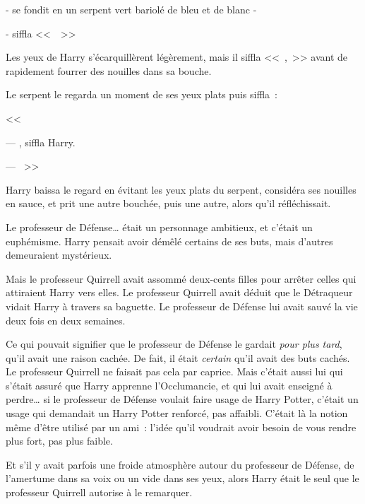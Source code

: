 - se fondit en un serpent vert bariolé de bleu et de blanc -

- siffla <<~~>>

Les yeux de Harry s'écarquillèrent légèrement, mais il siffla <<~,~>> avant de rapidement fourrer des nouilles dans sa bouche.

Le serpent le regarda un moment de ses yeux plats puis siffla~:

<<~

--- , siffla Harry.

--- ~>>

Harry baissa le regard en évitant les yeux plats du serpent, considéra ses nouilles en sauce, et prit une autre bouchée, puis une autre, alors qu'il réfléchissait.

Le professeur de Défense… était un personnage ambitieux, et c'était un euphémisme. Harry pensait avoir démêlé certains de ses buts, mais d'autres demeuraient mystérieux.

Mais le professeur Quirrell avait assommé deux-cents filles pour arrêter celles qui attiraient Harry vers elles. Le professeur Quirrell avait déduit que le Détraqueur vidait Harry à travers sa baguette. Le professeur de Défense lui avait sauvé la vie deux fois en deux semaines.

Ce qui pouvait signifier que le professeur de Défense le gardait \emph{pour plus tard}, qu'il avait une raison cachée. De fait, il était \emph{certain} qu'il avait des buts cachés. Le professeur Quirrell ne faisait pas cela par caprice. Mais c'était aussi lui qui s'était assuré que Harry apprenne l'Occlumancie, et qui lui avait enseigné à perdre… si le professeur de Défense voulait faire usage de Harry Potter, c'était un usage qui demandait un Harry Potter renforcé, pas affaibli. C'était là la notion même d'être utilisé par un ami~: l'idée qu'il voudrait avoir besoin de vous rendre plus fort, pas plus faible.

Et s'il y avait parfois une froide atmosphère autour du professeur de Défense, de l'amertume dans sa voix ou un vide dans ses yeux, alors Harry était le seul que le professeur Quirrell autorise à le remarquer.

